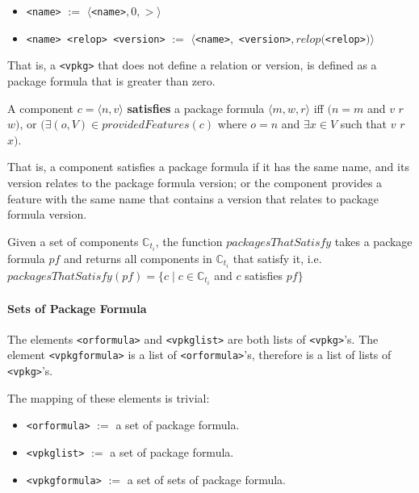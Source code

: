 \begin{itemize}
  \item \texttt{<name>} $:=$ $\langle $\texttt{<name>}$, 0 , > \rangle$
  \item \texttt{<name> <relop> <version>} $:=$ $\langle $\texttt{<name>}$,$ \texttt{<version>}$, relop($\texttt{<relop>}$) \rangle$
\end{itemize}
That is, a \texttt{<vpkg>} that does not define a relation or version, is defined as a package formula that is greater than zero.

\begin{defs}
A component $c = \langle n,v \rangle$ \textbf{satisfies} a package formula $\langle m,w,r\rangle$ iff
$(n = m$ and $v$ $r$ $w)$, or $(\exists (o,V) \in providedFeatures(c)$ where $o = n$ and $\exists x \in V$ such that $v$ $r$ $x)$. 
\end{defs}
That is, a component satisfies a package formula if it has the same name, and its version relates to the package formula version;
or the component provides a feature with the same name that contains a version that relates to package formula version.

\begin{defs}
Given a set of components $\mathbb{C}_{t_i}$,
the function $packagesThatSatisfy$ takes a package formula $pf$ and returns all components in  $\mathbb{C}_{t_i}$ that satisfy it, i.e. $packagesThatSatisfy(pf) = \{c \mid c \in \mathbb{C}_{t_i}$ and $ c$ satisfies $pf\}$
\end{defs}

\paragraph{Sets of Package Formula}
The elements \texttt{<orformula>} and \texttt{<vpkglist>} are both lists of \texttt{<vpkg>}'s.
The element \texttt{<vpkgformula>} is a list of \texttt{<orformula>}'s, therefore is a list of lists of \texttt{<vpkg>}'s.

The mapping of these elements is trivial:
\begin{itemize}
  \item \texttt{<orformula>} $ := $ a set of package formula.
  \item \texttt{<vpkglist>} $ := $ a set of package formula.
  \item \texttt{<vpkgformula>} $ := $ a set of sets of package formula.
\end{itemize}

